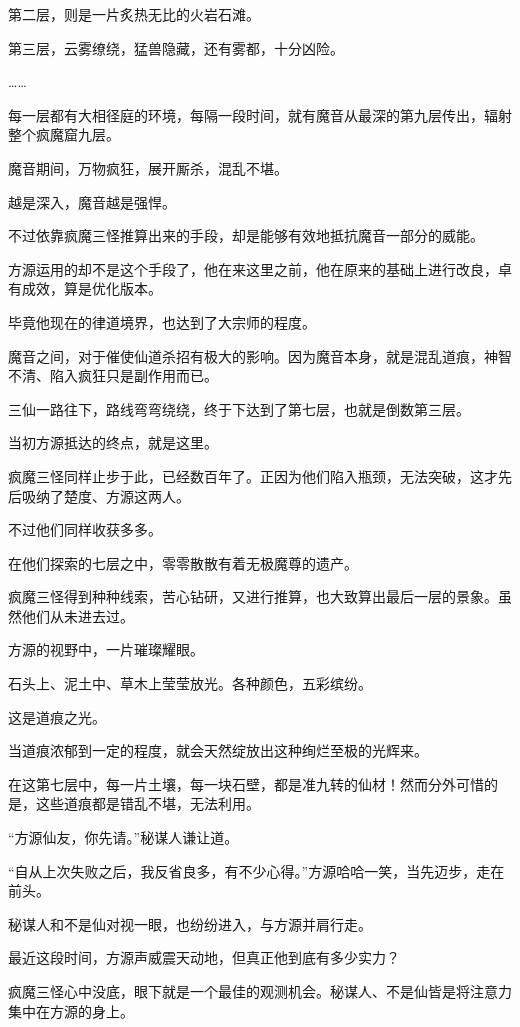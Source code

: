 \begin{this_body}
第二层，则是一片炙热无比的火岩石滩。

第三层，云雾缭绕，猛兽隐藏，还有雾都，十分凶险。

……

每一层都有大相径庭的环境，每隔一段时间，就有魔音从最深的第九层传出，辐射整个疯魔窟九层。

魔音期间，万物疯狂，展开厮杀，混乱不堪。

越是深入，魔音越是强悍。

不过依靠疯魔三怪推算出来的手段，却是能够有效地抵抗魔音一部分的威能。

方源运用的却不是这个手段了，他在来这里之前，他在原来的基础上进行改良，卓有成效，算是优化版本。

毕竟他现在的律道境界，也达到了大宗师的程度。

魔音之间，对于催使仙道杀招有极大的影响。因为魔音本身，就是混乱道痕，神智不清、陷入疯狂只是副作用而已。

三仙一路往下，路线弯弯绕绕，终于下达到了第七层，也就是倒数第三层。

当初方源抵达的终点，就是这里。

疯魔三怪同样止步于此，已经数百年了。正因为他们陷入瓶颈，无法突破，这才先后吸纳了楚度、方源这两人。

不过他们同样收获多多。

在他们探索的七层之中，零零散散有着无极魔尊的遗产。

疯魔三怪得到种种线索，苦心钻研，又进行推算，也大致算出最后一层的景象。虽然他们从未进去过。

方源的视野中，一片璀璨耀眼。

石头上、泥土中、草木上莹莹放光。各种颜色，五彩缤纷。

这是道痕之光。

当道痕浓郁到一定的程度，就会天然绽放出这种绚烂至极的光辉来。

在这第七层中，每一片土壤，每一块石壁，都是准九转的仙材！然而分外可惜的是，这些道痕都是错乱不堪，无法利用。

“方源仙友，你先请。”秘谋人谦让道。

“自从上次失败之后，我反省良多，有不少心得。”方源哈哈一笑，当先迈步，走在前头。

秘谋人和不是仙对视一眼，也纷纷进入，与方源并肩行走。

最近这段时间，方源声威震天动地，但真正他到底有多少实力？

疯魔三怪心中没底，眼下就是一个最佳的观测机会。秘谋人、不是仙皆是将注意力集中在方源的身上。


\end{this_body}
